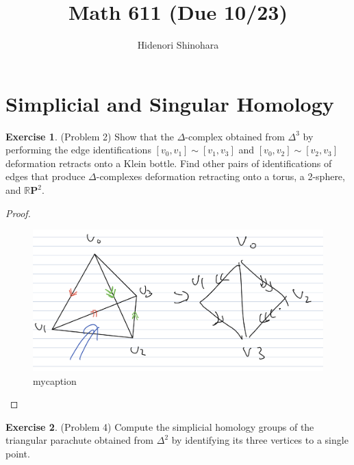 \documentclass[12pt, psamsfonts]{amsart}
\theoremstyle{definition}
\newtheorem*{exer}{Exercise}
\theoremstyle{remark}
\numberwithin{equation}{section}
\begin{document}
\title{Math 611 (Due 10/23)}
\author{Hidenori Shinohara}
\maketitle

\section{Simplicial and Singular Homology}

\begin{exer}{(Problem 2)}
  Show that the $\Delta$-complex obtained from $\Delta^3$ by performing the edge identifications $[v_0, v_1] \sim [v_1, v_3]$ and $[v_0, v_2] \sim [v_2, v_3]$ deformation retracts onto a Klein bottle.
  Find other pairs of identifications of edges that produce $\Delta$-complexes deformation retracting onto a torus, a 2-sphere, and $\mathbb{R}\mathbf{P}^2$.
\end{exer}

\begin{proof}
  \begin{figure}
  \includegraphics[width=.5\linewidth]{klein_delta3.jpeg}
  \caption{mycaption}
  \label{fig:mylabel}
  \end{figure}
\end{proof}

\begin{exer}{(Problem 4)}
  Compute the simplicial homology groups of the triangular parachute obtained from $\Delta^2$ by identifying its three vertices to a single point.
\end{exer}
\end{document}
